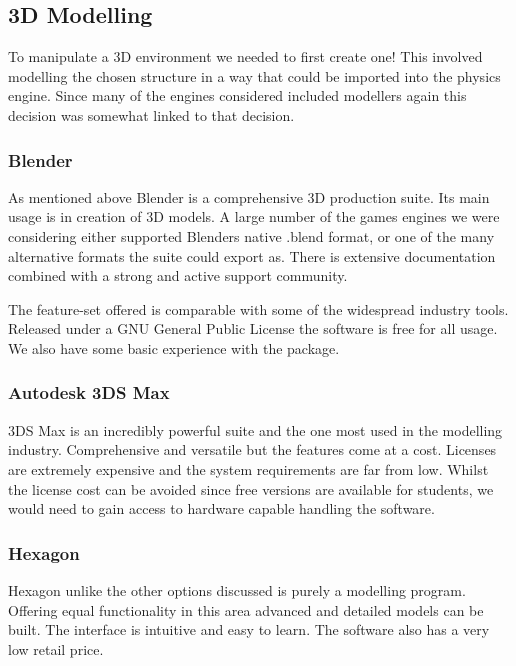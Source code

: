 \subsection{3D Modelling}

To manipulate a 3D environment we needed to first create one! This
involved modelling the chosen structure in a way that could be imported
into the physics engine. Since many of the engines considered included
modellers again this decision was somewhat linked to that decision.



\subsubsection{Blender}

As mentioned above Blender is a comprehensive 3D production suite.
Its main usage is in creation of 3D models. A large number of the
games engines we were considering either supported Blenders native
.blend format, or one of the many alternative formats the suite could
export as. There is extensive documentation combined with a strong
and active support community.

The feature-set offered is comparable with some of the widespread industry
tools. Released under a GNU General Public License the software is
free for all usage. We also have some basic experience with the package.


\subsubsection{Autodesk 3DS Max}

3DS Max is an incredibly powerful suite and the one most used in the
modelling industry. Comprehensive and versatile but the features come
at a cost. Licenses are extremely expensive and the system requirements
are far from low. Whilst the license cost can be avoided since free
versions are available for students, we would need to gain access
to hardware capable handling the software.


\subsubsection{Hexagon}

Hexagon unlike the other options discussed is purely a modelling program.
Offering equal functionality in this area advanced and detailed models
can be built. The interface is intuitive and easy to learn. The software
also has a very low retail price.


